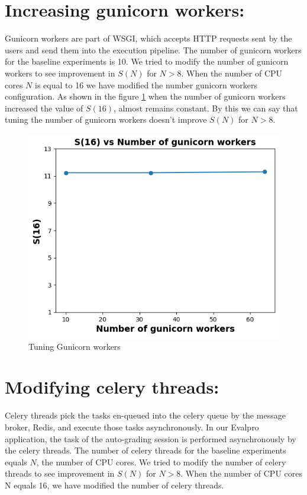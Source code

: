 \documentclass{iitbreport}
\begin{document}
\section{Increasing gunicorn workers:}
Gunicorn workers are part of WSGI, which accepts HTTP requests sent by the users and send them into the execution pipeline. The number of gunicorn workers for the baseline experiments is 10. We tried to modify the number of gunicorn workers to see improvement in $S(N)$ for $N>8$. When the number of CPU cores $N$ is equal to 16 we have modified the number gunicorn workers configuration. As shown in the figure \ref{gunicorn_plot} when the number of gunicorn workers increased the value of $S(16)$, almost remains constant. By this we can say that tuning the number of gunicorn workers doesn't improve  $S(N)$ for $N>8$.
\begin{figure}[!htb]
  \centering
  \includegraphics[width=\linewidth]{Images/gunicorn_workers.png}
  \caption{Tuning Gunicorn workers}
  \label{gunicorn_plot}
\end{figure}

\section{Modifying celery threads:}
Celery threads pick the tasks en-queued into the celery queue by the message broker, Redis, and execute those tasks asynchronously. In our Evalpro application, the task of the auto-grading session is performed asynchronously by the celery threads. The number of celery threads for the baseline experiments equals $N$, the number of CPU cores. We tried to modify the number of celery threads to see improvement in $S(N)$ for $N>8$. When the number of CPU cores N equals 16, we have modified the number of celery threads. 
\end{document}
